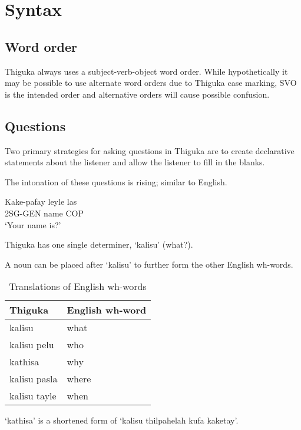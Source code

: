 \newpage

\section{Syntax}
\subsection{Word order}
Thiguka always uses a subject-verb-object word order.
While hypothetically it may be possible to use alternate word orders due to Thiguka case marking, SVO is the intended order and alternative orders will cause possible confusion.

\subsection{Questions}
Two primary strategies for asking questions in Thiguka are to create declarative statements about the listener and allow the listener to fill in the blanks.

The intonation of these questions is rising; similar to English.

\begin{exe}
    \ex{} \gll{}Kake-pafay leyle las\\
    2SG-GEN name COP\\
    \glt{}`Your name is?'
\end{exe}

Thiguka has one single determiner, `kalisu' (what?).

A noun can be placed after `kalisu' to further form the other English wh-words.

\begin{table}[h!]
    \centering
    \caption{Translations of English wh-words}
    \begin{tabularx}{8cm}{|X|X|}
        \hline
        \textbf{Thiguka} & \textbf{English wh-word} \\
        \hline
        kalisu & what \\
        kalisu pelu & who \\
        kathisa & why \\
        kalisu pasla & where \\
        kalisu tayle & when \\
        \hline
    \end{tabularx}
\end{table}

`kathisa' is a shortened form of `kalisu thilpahelah kufa kaketay'.

